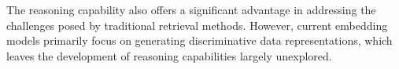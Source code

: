 The reasoning capability also offers a significant advantage in addressing the challenges posed by traditional retrieval methods. However, current embedding models primarily focus on generating discriminative data representations, which leaves the development of reasoning capabilities largely unexplored. 



